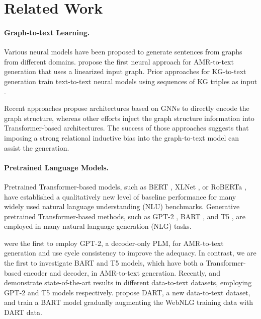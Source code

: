\documentclass[11pt]{article}
\begin{document}
\section{Related Work}



\paragraph{Graph-to-text Learning.} Various neural models have been proposed to generate sentences from graphs from different domains. \citet{konsas_17} propose the first neural approach for AMR-to-text generation that uses a linearized input graph. Prior approaches for KG-to-text generation train text-to-text neural models using sequences of KG triples as input \cite{trisedya-etal-2018-gtr, moryossef-etal-2019-step, castro-ferreira-etal-2019-neural, ribeiro2021smelting}. 

Recent approaches \cite{marcheggiani-icnl18, song-etal-acl2018, beck-etal-2018-acl2018, damonte-cohen-2019-structural, ribeiro-etal-2019-enhancing,zhao-etal-2020-bridging, schmitt-etal-2021-modeling, ribeiro2021structural} propose architectures based on GNNs to directly encode the graph structure, whereas other efforts \cite{ribeiro-etal-2020-modeling, schmitt2020modeling, yao-etal-2020-heterogeneous, doi:10.116200297} inject the graph structure information into Transformer-based architectures. The success of those approaches suggests that imposing a strong relational inductive bias into the graph-to-text model can assist the generation.

\paragraph{Pretrained Language Models.}  Pretrained Transformer-based models, such as BERT \cite{devlin-etal-2019-bert}, XLNet \cite{NIPS2019_8812}, or RoBERTa \cite{liu2020roberta}, have established a qualitatively new level of baseline performance for many widely used natural language understanding (NLU) benchmarks. Generative pretrained Transformer-based methods, such as GPT-2 \cite{radford2019language}, BART \cite{lewis2019bart}, and T5 \cite{2019t5}, are employed in many natural language generation (NLG) tasks.  

\citet{mager2020gpttoo} were the first to employ GPT-2, a decoder-only PLM, for AMR-to-text generation and use cycle consistency to improve the adequacy. In contrast, we are the first to investigate BART and T5 models, which have both a Transformer-based encoder and decoder, in AMR-to-text generation. Recently, \citet{harkous2020text} and \citet{kale2020texttotext} demonstrate state-of-the-art results in different data-to-text datasets, employing GPT-2 and T5 models respectively. \citet{radev2020dart} propose DART, a new data-to-text dataset, and train a BART model gradually augmenting the WebNLG training data with DART data. 
\end{document}
